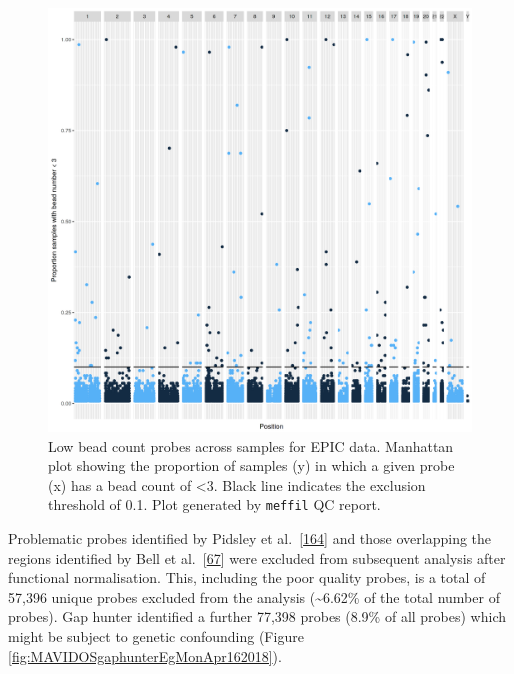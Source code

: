 \documentclass[
]{book}
\begin{document}
\begin{figure}

{\centering \includegraphics[width=0.8\linewidth]{figs/MAVIDOSqcEPICbeadNumAcross} 

}

\caption{Low bead count probes across samples for EPIC data. Manhattan plot showing the proportion of samples (y) in which a given probe (x) has a bead count of \textless3. Black line indicates the exclusion threshold of 0.1. Plot generated by \texttt{meffil} QC report.}\label{fig:MAVIDOSqcEPICbeadNumAcross}
\end{figure}



Problematic probes identified by Pidsley et al.~{[}\protect\hyperlink{ref-Pidsley2016}{164}{]} and those overlapping the regions identified by Bell et al.~{[}\protect\hyperlink{ref-Bell2017a}{67}{]} were excluded from subsequent analysis after functional normalisation.
This, including the poor quality probes, is a total of 57,396 unique probes excluded from the analysis (\textasciitilde6.62\% of the total number of probes).
Gap hunter identified a further 77,398 probes (8.9\% of all probes) which might be subject to genetic confounding (Figure \ref{fig:MAVIDOSgaphunterEgMonApr162018}).
\end{document}
